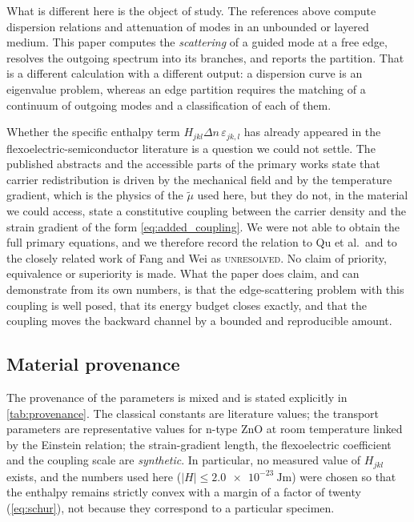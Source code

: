 What is different here is the object of study.  The references above compute
dispersion relations and attenuation of modes in an unbounded or layered
medium.  This paper computes the \emph{scattering} of a guided mode at a free
edge, resolves the outgoing spectrum into its branches, and reports the
partition.  That is a different calculation with a different output: a
dispersion curve is an eigenvalue problem, whereas an edge partition requires
the matching of a continuum of outgoing modes and a classification of each of
them.

Whether the specific enthalpy term $H_{jkl}\Delta n\,\varepsilon_{jk,l}$ has
already appeared in the flexoelectric-semiconductor literature is a question we
could not settle.  The published abstracts and the accessible parts of the
primary works state that carrier redistribution is driven by the mechanical
field and by the temperature gradient, which is the physics of the
$\widetilde\mu$ used here, but they do not, in the material we could access,
state a constitutive coupling between the carrier density and the strain
gradient of the form \eqref{eq:added_coupling}.  We were not able to obtain the
full primary equations, and we therefore record the relation to Qu et al.\ and
to the closely related work of Fang and Wei as \textsc{unresolved}.  No claim of
priority, equivalence or superiority is made.  What the paper does claim, and
can demonstrate from its own numbers, is that the edge-scattering problem with
this coupling is well posed, that its energy budget closes exactly, and that
the coupling moves the backward channel by a bounded and reproducible amount.

\subsection{Material provenance}
\label{sec:disc_material}

The provenance of the parameters is mixed and is stated explicitly in
\cref{tab:provenance}.  The classical constants are literature values; the
transport parameters are representative values for n-type ZnO at room
temperature linked by the Einstein relation; the strain-gradient length, the
flexoelectric coefficient and the coupling scale are \emph{synthetic}.  In
particular, no measured value of $H_{jkl}$ exists, and the numbers used here
($|H|\le\SI{2.0e-23}{\joule\metre}$) were chosen so that the enthalpy remains
strictly convex with a margin of a factor of twenty
(\cref{eq:schur}), not because they correspond to a particular specimen.

